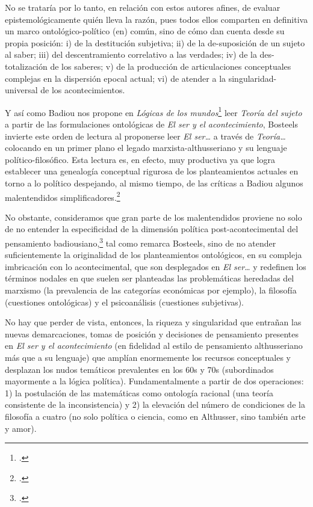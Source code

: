 No se trataría por lo tanto, en relación con estos autores afines, de evaluar epistemológicamente quién lleva la razón, pues todos ellos comparten en definitiva un marco ontológico-político (en) común, sino de cómo dan cuenta desde su propia posición: i) de la destitución subjetiva; ii) de la de-suposición de un sujeto al saber; iii) del descentramiento correlativo a las verdades; iv) de la des-totalización de los saberes; v) de la producción de articulaciones conceptuales complejas en la dispersión epocal actual; vi) de atender a la singularidad-universal de los acontecimientos.

Y así como Badiou nos propone en \emph{Lógicas de los mundos}\footcite{@7019-BADIOU2008} leer \emph{Teoría del sujeto} a partir de las formulaciones ontológicas de \emph{El ser y el acontecimiento}, Bosteels invierte este orden de lectura al proponerse leer \emph{El ser\ldots} a través de \emph{Teoría\ldots} colocando en un primer plano el legado marxista-althusseriano y su lenguaje político-filosófico. Esta lectura es, en efecto, muy productiva ya que logra establecer una genealogía conceptual rigurosa de los planteamientos actuales en torno a lo político despejando, al mismo tiempo, de las críticas a Badiou algunos malentendidos simplificadores.\footcite{@7022-BOSTEELS2007}

No obstante, consideramos que gran parte de los malentendidos proviene no solo de no entender la especificidad de la dimensión política post-acontecimental del pensamiento badiousiano,\footcite{@7071-FARRAN2009} tal como remarca Bosteels, sino de no atender suficientemente la originalidad de los planteamientos ontológicos, en su compleja imbricación con lo acontecimental, que son desplegados en \emph{El ser\ldots} y redefinen los términos nodales en que suelen ser planteadas las problemáticas heredadas del marxismo (la prevalencia de las categorías económicas por ejemplo), la filosofía (cuestiones ontológicas) y el psicoanálisis (cuestiones subjetivas).

No hay que perder de vista, entonces, la riqueza y singularidad que entrañan las nuevas demarcaciones, tomas de posición y decisiones de pensamiento presentes en \emph{El ser y el acontecimiento} (en fidelidad al estilo de pensamiento althusseriano más que a su lenguaje) que amplían enormemente los recursos conceptuales y desplazan los nudos temáticos prevalentes en los 60s y 70s (subordinados mayormente a la lógica política). Fundamentalmente a partir de dos operaciones: 1) la postulación de las matemáticas como ontología racional (una teoría consistente de la inconsistencia) y 2) la elevación del número de condiciones de la filosofía a cuatro (no solo política o ciencia, como en Althusser, sino también arte y amor).


